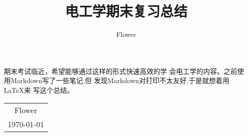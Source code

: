 \documentclass{ctexart}%
\date{}
\title{电工学期末复习总结}
\author{Flower}
\begin{document}
\maketitle

期末考试临近，希望能够通过这样的形式快速高效的学
会电工学的内容。之前使用Markdown写了一些笔记,但
发现Markdown对打印不太友好,于是就想着用\LaTeX{}来
写这个总结。
~\\
\begin{flushright}
    \begin{tabular}{c}
        Flower\\
        \today
    \end{tabular}
\end{flushright}

\newpage
\tableofcontents
\newpage








\newpage
\end{document}
